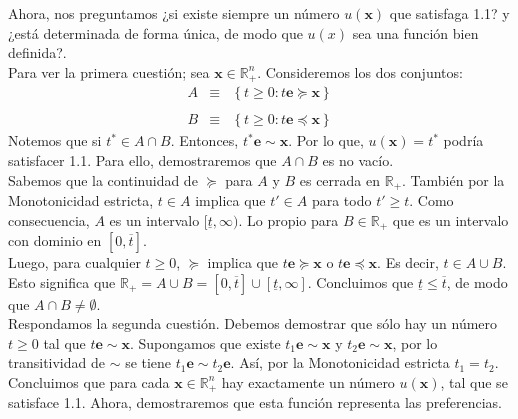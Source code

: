 \begin{enumerate}
	Ahora, nos preguntamos ¿si existe siempre un número $u(\textbf{x})$ que satisfaga 1.1? y ¿está determinada de forma única, de modo que $u(x)$ sea una función bien definida?. \\

	Para ver la primera cuestión; sea $\textbf{x}\in \mathbb{R}^n_+$.  Consideremos los dos conjuntos:
	$$
	\begin{array}{rcl}
	    A &\equiv& \left\{t\geq 0: t\textbf{e}\succeq \textbf{x}\right\}\\\\
	    B &\equiv& \left\{t\geq 0: t\textbf{e}\preceq \textbf{x}\right\}
	\end{array}
	$$
	Notemos que si $t^*\in A\cap B$. Entonces, $t^*\textbf{e}\sim \textbf{x}$. Por lo que, $u(\textbf{x})=t^*$ podría satisfacer 1.1. Para ello, demostraremos que $A\cap B$ es no vacío. \\

	Sabemos que la continuidad de $\succeq$ para $A$ y $B$ es cerrada en $\mathbb{R}_+$. También por la Monotonicidad estricta, $t\in A$ implica que $t'\in A$ para todo $t'\geq t$. Como consecuencia, $A$ es un intervalo $[\underline{t},\infty)$. Lo propio para $B\in \mathbb{R}_+$ que es un intervalo con dominio en $[0,\overline{t}]$.\\

	Luego, para cualquier $t\geq 0$, $\succeq$ implica que $t\textbf{e}\succeq \textbf{x}$ o $t\textbf{e}\preceq \textbf{x}$. Es decir, $t\in A\cup B$. Esto significa que $\mathbb{R}_+=A\cup B=[0,\overline{t}]\cup [\underline{t},\infty]$. Concluimos que $\underline{t}\leq \overline{t}$, de modo que $A\cap B\neq \emptyset$.\\

	Respondamos la segunda cuestión. Debemos demostrar que sólo hay un número $t\geq 0$ tal que $t\textbf{e}\sim \textbf{x}$. Supongamos que existe $t_1\textbf{e}\sim \textbf{x}$ y $t_2\textbf{e}\sim\textbf{x}$, por lo transitividad de $\sim$ se tiene $t_1\textbf{e}\sim t_2\textbf{e}$. Así, por la Monotonicidad estricta $t_1=t_2$.\\

	Concluimos que para cada $\textbf{x}\in \mathbb{R}_+^n$ hay exactamente un número $u(\textbf{x})$, tal que se satisface 1.1. Ahora, demostraremos que esta función representa las preferencias.\\


\end{enumerate}
